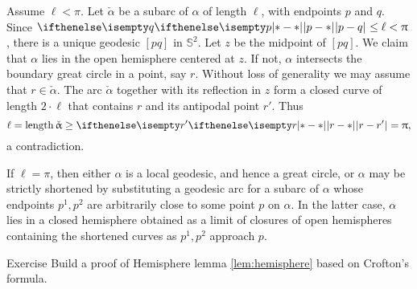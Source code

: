 
Assume $\ell<\pi$.
Let $\check\alpha$ be a subarc of $\alpha$ of length $\ell$, with endpoints $p$ and $q$. 
Since $\dist{p}{q}{}\le\ell<\pi$, there is a unique geodesic $[pq]$ in $\mathbb{S}^2$.  
Let $z$ be the midpoint of  $[pq]$.  
We claim that $\alpha$ lies in the open hemisphere centered at $z$.  
If not, $\alpha$ intersects the boundary  great circle in a point, say $r$.
Without loss of generality we may assume that $r\in\check\alpha$. 
The arc $\check\alpha$ together with its reflection in $z$ form a closed curve of length $2\cdot \ell$ that contains $r$ and its antipodal point $r'$.
Thus 
\[\ell=\length \check\alpha\ge \dist{r}{r'}{}=\pi,\] 
a contradiction.

If $\ell=\pi$, then either $\alpha$ is a local geodesic, and hence a great circle, 
or $\alpha$ may be strictly shortened by substituting a geodesic arc for a subarc of $\alpha$ 
whose endpoints $p^1,p^2$ are arbitrarily close to some point $p$ on  $\alpha$.
In the latter case,  $\alpha$ lies in a closed hemisphere obtained as a limit of closures of open hemispheres  containing the shortened curves as $p^1,p^2$ approach $p$.
\qeds




\begin{thm}{Exercise}\label{exr-crofton}
Build a proof of Hemisphere lemma
\ref{lem:hemisphere} based on Crofton's formula.
\end{thm}







